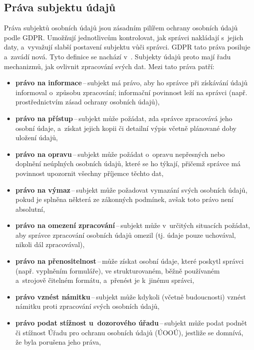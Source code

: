 \subsection{Práva subjektu údajů}
Práva subjektů osobních údajů jsou zásadním pilířem ochrany osobních údajů podle GDPR.
Umožňují jednotlivcům kontrolovat, jak správci nakládají s~jejich daty, a~vyvažují slabší postavení subjektu vůči správci.
GDPR tato práva posiluje a~zavádí nová.
Tyto definice se nachází v~\cite[Kapitola III]{eu-2016-679}.
Subjekty údajů proto mají řadu mechanizmů, jak ovlivnit zpracování svých dat.
Mezi tato práva patří:
\begin{itemize}
    \item \textbf{právo na informace}\,--\,subjekt má právo, aby ho správce při získávání údajů informoval o~způsobu zpracování; informační povinnost leží na správci (např. prostřednictvím zásad ochrany osobních údajů),
    \item \textbf{právo na přístup}\,--\,subjekt může požádat, zda správce zpracovává jeho osobní údaje, a~získat jejich kopii či detailní výpis včetně plánované doby uložení údajů,
    \item \textbf{právo na opravu}\,--\,subjekt může požádat o~opravu nepřesných nebo doplnění neúplných osobních údajů, které se ho týkají, přičemž správce má povinnost upozornit všechny příjemce těchto dat,
    \item \textbf{právo na výmaz}\,--\,subjekt může požadovat vymazání svých osobních údajů, pokud je splněna některá ze zákonných podmínek, avšak toto právo není absolutní,
    \item \textbf{právo na omezení zpracování}\,--\,subjekt může v~určitých situacích požádat, aby správce zpracování osobních údajů omezil (tj. údaje pouze uchovával, nikoli dál zpracovával),
    \item \textbf{právo na přenositelnost}\,--\,může získat osobní údaje, které poskytl správci (např. vyplněním formuláře), ve strukturovaném, běžně používaném a~strojově čitelném formátu, a~přenést je k~jinému správci,
    \item \textbf{právo vznést námitku}\,--\,subjekt může kdykoli (včetně budoucnosti) vznést námitku proti zpracování svých osobních údajů,
    \item \textbf{právo podat stížnost u~dozorového úřadu}\,--\,subjekt může podat podnět či stížnost Úřadu pro ochranu osobních údajů (ÚOOÚ), jestliže se domnívá, že byla porušena jeho práva,
\end{itemize}

